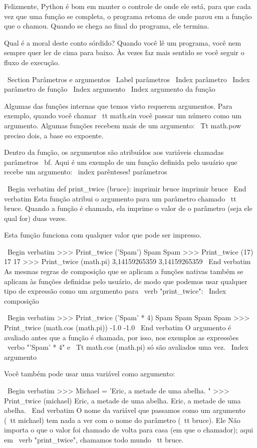 \documentclass[10pt]{book}
\begin{document}
{Felizmente, Python é bom em manter o controle de onde ele está, para que cada
vez que uma função se completa, o programa retoma de onde parou em
a função que o chamou. Quando se chega ao final do programa,
ele termina.

Qual é a moral deste conto sórdido? Quando você lê um programa, você
nem sempre quer ler de cima para baixo. Às vezes faz
mais sentido se você seguir o fluxo de execução.


\ Section {Parâmetros e argumentos}
\ Label {parâmetros}
\ Index {parâmetro}
\ Index {parâmetro de função}
\ Index {argumento}
\ Index {argumento da função}

Algumas das funções internas que temos visto requerem argumentos. Para
exemplo, quando você chamar {\ tt math.sin} você passar um número
como um argumento. Algumas funções recebem mais de um argumento:
{\ Tt math.pow} preciso dois, a base eo expoente.

Dentro da função, os argumentos são atribuídos aos
variáveis ​​chamadas parâmetros {\ bf}. Aqui é um exemplo de um
função definida pelo usuário que recebe um argumento:
\ index {parênteses! parâmetros}

\ Begin {verbatim}
def print_twice (bruce):
    imprimir bruce
    imprimir bruce
\ End {verbatim}
%
Esta função atribui o argumento para um parâmetro
chamado {\ tt bruce}. Quando a função é chamada, ela imprime o valor de
o parâmetro (seja ele qual for) duas vezes.

Esta função funciona com qualquer valor que pode ser impresso.

\ Begin {verbatim}
>>> Print_twice ('Spam')
Spam
Spam
>>> Print_twice (17)
17
17
>>> Print_twice (math.pi)
3,14159265359
3,14159265359
\ End {verbatim}
%
As mesmas regras de composição que se aplicam a funções nativas também
se aplicam às funções definidas pelo usuário, de modo que podemos usar qualquer tipo de expressão
como um argumento para \ verb "print_twice":
\ Index {composição}

\ Begin {verbatim}
>>> Print_twice ('Spam' * 4)
Spam Spam
Spam Spam
>>> Print_twice (math.cos (math.pi))
-1.0
-1.0
\ End {verbatim}
%
O argumento é avaliado antes que a função é chamada, por isso,
nos exemplos as expressões \ verbo "'Spam' * 4" e
{\ Tt math.cos (math.pi)} só são avaliados uma vez.
\ Index {argumento}

Você também pode usar uma variável como argumento:

\ Begin {verbatim}
>>> Michael = 'Eric, a metade de uma abelha. "
>>> Print_twice (michael)
Eric, a metade de uma abelha.
Eric, a metade de uma abelha.
\ End {verbatim}
%
O nome da variável que passamos como um argumento ({\ tt michael}) tem
nada a ver com o nome do parâmetro ({\ tt bruce}). Ele
Não importa o que o valor foi chamado de volta para casa (em que o chamador);
aqui em \ verb "print_twice", chamamos todo mundo {\ tt bruce}.


}
\end{document}
